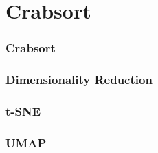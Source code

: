 \documentclass{beamer}
\begin{document}

\section{Crabsort}

\begin{frame}
  \frametitle{Crabsort}
\end{frame}


\begin{frame}
  \frametitle{Dimensionality Reduction}
\end{frame}


\begin{frame}
  \frametitle{t-SNE}
\end{frame}


\begin{frame}
  \frametitle{UMAP}
\end{frame}
\end{document}
